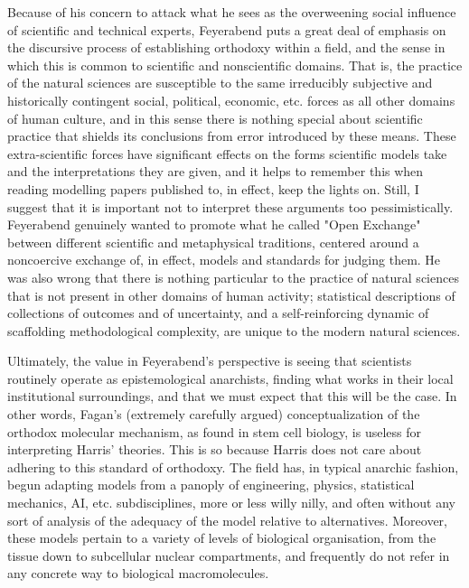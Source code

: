 Because of his concern to attack what he sees as the overweening social influence of scientific and technical experts, Feyerabend puts a great deal of emphasis on the discursive process of establishing orthodoxy within a field, and the sense in which this is common to scientific and nonscientific domains. That is, the practice of the natural sciences are susceptible to the same irreducibly subjective and historically contingent social, political, economic, etc. forces as all other domains of human culture, and in this sense there is nothing special about scientific practice that shields its conclusions from error introduced by these means. These extra-scientific forces have significant effects on the forms scientific models take and the interpretations they are given, and it helps to remember this when reading modelling papers published to, in effect, keep the lights on. Still, I suggest that it is important not to interpret these arguments too pessimistically. Feyerabend genuinely wanted to promote what he called "Open Exchange" between different scientific and metaphysical traditions, centered around a noncoercive exchange of, in effect, models and standards for judging them. He was also wrong that there is nothing particular to the practice of natural sciences that is not present in other domains of human activity; statistical descriptions of collections of outcomes and of uncertainty, and a self-reinforcing dynamic of scaffolding methodological complexity, are unique to the modern natural sciences.

Ultimately, the value in Feyerabend's perspective is seeing that scientists routinely operate as epistemological anarchists, finding what works in their local institutional surroundings, and that we must expect that this will be the case. In other words, Fagan's (extremely carefully argued) conceptualization of the orthodox molecular mechanism, as found in stem cell biology, is useless for interpreting Harris' theories. This is so because Harris does not care about adhering to this standard of orthodoxy. The field has, in typical anarchic fashion, begun adapting models from a panoply of engineering, physics, statistical mechanics, AI, etc. subdisciplines, more or less willy nilly, and often without any sort of analysis of the adequacy of the model relative to alternatives. Moreover, these models pertain to a variety of levels of biological organisation, from the tissue down to subcellular nuclear compartments, and frequently do not refer in any concrete way to biological macromolecules.

